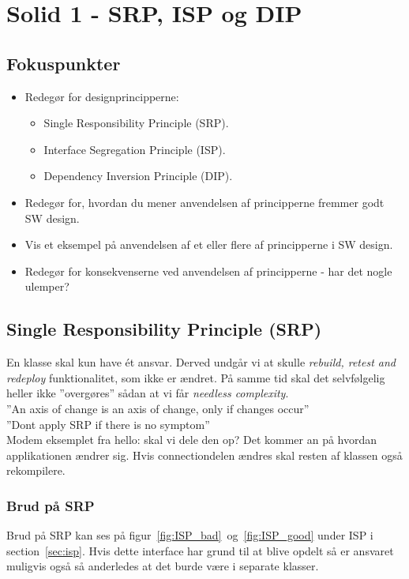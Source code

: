 \section{Solid 1 - SRP, ISP og DIP}

\subsection{Fokuspunkter}

\begin{itemize}
	\item Redegør for designprincipperne:
	\begin{itemize}
		\item Single Responsibility Principle (SRP).
		\item Interface Segregation Principle (ISP).
		\item Dependency Inversion Principle (DIP).
	\end{itemize}
	\item Redegør for, hvordan du mener anvendelsen af principperne fremmer godt SW design.
	\item Vis et eksempel på anvendelsen af et eller flere af principperne i SW design.
	\item Redegør for konsekvenserne ved anvendelsen af principperne - har det nogle ulemper?
\end{itemize}


\subsection{Single Responsibility Principle (SRP)}
En klasse skal kun have ét ansvar. Derved undgår vi at skulle \textit{rebuild, retest and redeploy} funktionalitet, som ikke er ændret. På samme tid skal det selvfølgelig heller ikke ''overgøres'' sådan at vi får \textit{needless complexity}.\\

''An axis of change is an axis of change, only if changes occur''\\

''Dont apply SRP if there is no symptom''\\

Modem eksemplet fra hello: skal vi dele den op? Det kommer an på hvordan applikationen ændrer sig. Hvis connectiondelen ændres skal resten af klassen også rekompilere.

\subsubsection{Brud på SRP} \label{sec:brud_isp}
Brud på SRP kan ses på figur~\ref{fig:ISP_bad}~og~\ref{fig:ISP_good} under ISP i section~\ref{sec:isp}. Hvis dette interface har grund til at blive opdelt så er ansvaret muligvis også så anderledes at det burde være i separate klasser.

